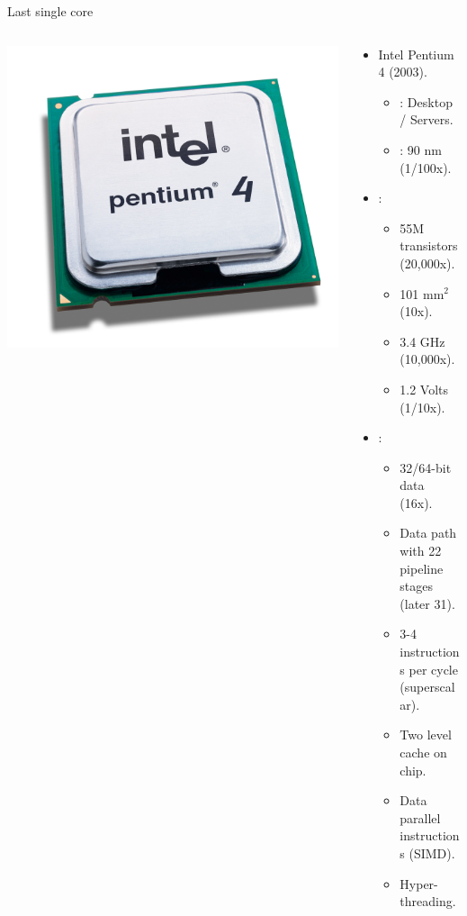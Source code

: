 \begin{frame}[t]{Last single core}
\begin{columns}
\begin{column}{.15\textwidth}
\begin{center}
      \includegraphics[width=.9\textwidth]{images/intel-p4.jpg}\\
    \end{center}
  \end{column}
  \begin{column}{.85\textwidth}
    \begin{itemize}
      \item Intel Pentium 4 (2003).
        \begin{itemize}
          \item {}: Desktop / Servers.
          \item {}: 90 nm (1/100x).
        \end{itemize}
      \item {}:
        \begin{itemize}
          \item 55M transistors (20,000x).
          \item 101 mm$^2$ (10x).
          \item 3.4 GHz (10,000x).
          \item 1.2 Volts (1/10x).
        \end{itemize}
      \item {}:
        \begin{itemize}
          \item 32/64-bit data (16x).
          \item Data path with 22 pipeline stages (later 31).
          \item 3-4 instructions per cycle (superscalar).
          \item Two level cache on chip.
          \item Data parallel instructions (SIMD).
          \item Hyper-threading.
        \end{itemize}
    \end{itemize}
  \end{column}
\end{columns}
\end{frame}

